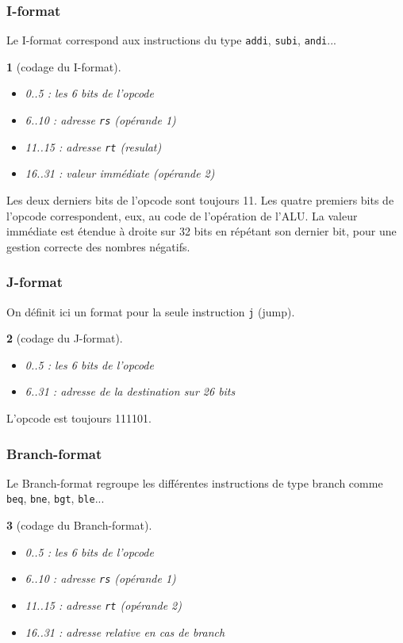 \documentclass[13pt]{article}
\newtheorem{format}{  }
\begin{document}
\subsubsection{I-format}

Le I-format correspond aux instructions du type \texttt{addi}, \texttt{subi},
\texttt{andi}...

\begin{format}[codage du I-format]
  \begin{itemize}
  \item 0..5 : les 6 bits de l'opcode
  \item 6..10 : adresse \texttt{rs} (opérande 1)
  \item 11..15 : adresse \texttt{rt} (resulat)
  \item 16..31 : valeur immédiate (opérande 2)
  \end{itemize}
\end{format}

Les deux derniers bits de l'opcode sont toujours 11.
Les quatre premiers bits de l'opcode correspondent, eux, au code
de l'opération de l'ALU. La valeur immédiate est étendue à droite sur 
32 bits en répétant son dernier bit, pour une gestion correcte des nombres
négatifs.

\subsubsection{J-format}

On définit ici un format pour la seule instruction \texttt{j} (jump).

\begin{format}[codage du J-format]
  \begin{itemize}
  \item 0..5 : les 6 bits de l'opcode
  \item 6..31 : adresse de la destination sur 26 bits
  \end{itemize}
\end{format}

L'opcode est toujours 111101. 

\subsubsection{Branch-format}

Le Branch-format regroupe les différentes instructions de type branch comme
\texttt{beq}, \texttt{bne}, \texttt{bgt}, \texttt{ble}...

\begin{format}[codage du Branch-format]
  \begin{itemize}
  \item 0..5 : les 6 bits de l'opcode
  \item 6..10 : adresse \texttt{rs} (opérande 1)
  \item 11..15 : adresse \texttt{rt} (opérande 2)
  \item 16..31 : adresse relative en cas de branch
  \end{itemize}
\end{format}
\end{document}
